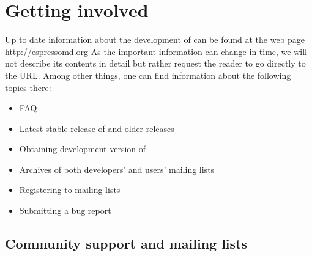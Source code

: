 %  
%   
%  
%  
%
\chapter{Getting involved}
\label{chap:devel}

Up to date information about the development of \es
can be found at the web page \url{http://espressomd.org}
As the important information can change in time, we will not describe
its contents in detail but rather request the reader to
go directly to the URL.
Among other things, one can find information about the following topics there:

\begin{itemize}
\item FAQ
\item Latest stable release of \es and older releases
\item Obtaining development version of \es
\item Archives of both developers' and users' mailing lists
\item Registering to \es mailing lists
\item Submitting a bug report
\end{itemize}

\section{Community support and mailing lists}

